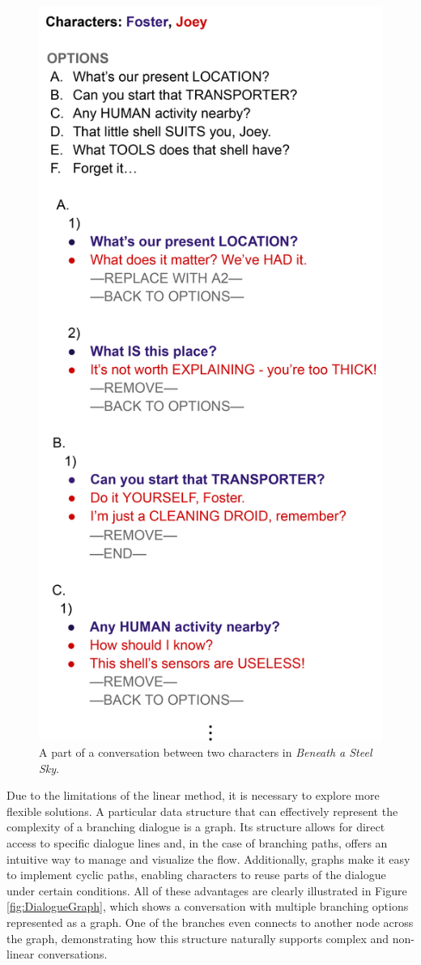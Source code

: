 \begin{figure}[H]
\centering
\includegraphics[width=.5\linewidth]{img/DialogueBig3.png}
\caption{A part of a conversation between two characters in \textit{Beneath a Steel Sky}.}
\label{fig:DialogueChoices}
\end{figure}

Due to the limitations of the linear method, it is necessary to explore more flexible solutions. A particular data structure that can effectively represent the complexity of a branching dialogue is a graph. Its structure allows for direct access to specific dialogue lines and, in the case of branching paths, offers an intuitive way to manage and visualize the flow. Additionally, graphs make it easy to implement cyclic paths, enabling characters to reuse parts of the dialogue under certain conditions. All of these advantages are clearly illustrated in Figure \ref{fig:DialogueGraph}, which shows a conversation with multiple branching options represented as a graph. One of the branches even connects to another node across the graph, demonstrating how this structure naturally supports complex and non-linear conversations.

